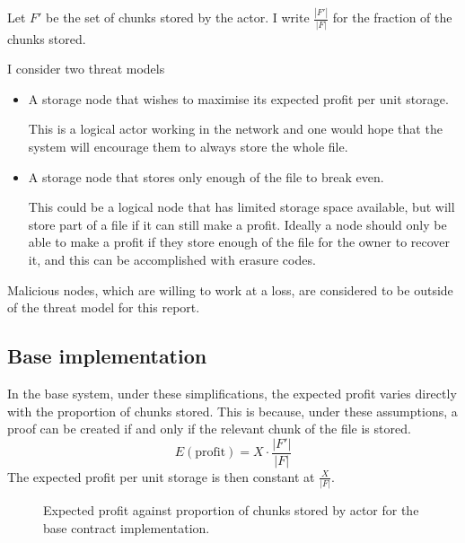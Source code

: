 \documentclass[12pt,a4paper,twoside,openright]{report}
\begin{document}
Let $F'$ be the set of chunks stored by the actor. I write $\frac{|F'|}{|F|}$ for the fraction of the chunks stored.

I consider two threat models
\begin{itemize}
\item A storage node that wishes to maximise its expected profit per unit storage.

This is a logical actor working in the network and one would hope that the system will encourage them to always store the whole file.

\item A storage node that stores only enough of the file to break even.

This could be a logical node that has limited storage space available, but will store part of a file if it can still make a profit.
Ideally a node should only be able to make a profit if they store enough of the file for the owner to recover it, and this can be accomplished with erasure codes.
\end{itemize}

Malicious nodes, which are willing to work at a loss, are considered to be outside of the threat model for this report.

\subsection{Base implementation}

In the base system, under these simplifications,
the expected profit varies directly with the proportion of chunks stored.
This is because, under these assumptions, a proof can be created if and only if the relevant chunk of the file is stored.
\[E(\text{profit}) = X \cdot \frac{|F'|}{|F|}\]
The expected profit per unit storage is then constant at $\frac{X}{|F|}$.

\begin{figure}[H]

\caption[Expected attacker profit: base implementation]{Expected profit against proportion of chunks stored by actor for the base contract implementation.}
\end{figure}
\end{document}

